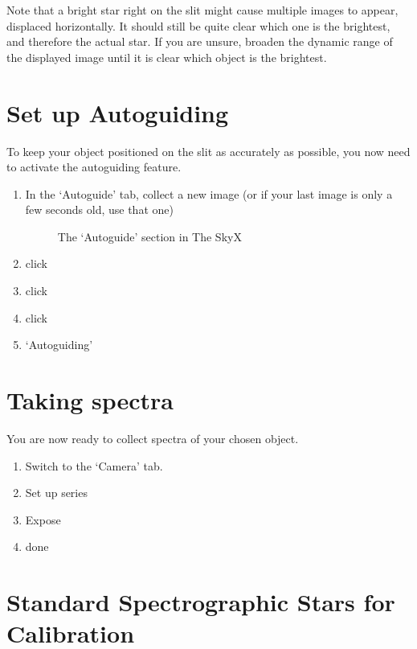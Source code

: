\documentclass[12pt,twoside,a4paper]{report}
\begin{document}
Note that a bright star right on the slit might cause multiple images to appear, displaced horizontally. It should still be quite clear which one is the brightest, and therefore the actual star. If you are unsure, broaden the dynamic range of the displayed image until it is clear which object is the brightest.


\section{Set up Autoguiding}

To keep your object positioned on the slit as accurately as possible, you now need to activate the autoguiding feature.

\begin{enumerate}
 \item In the `Autoguide' tab, collect a new image (or if your last image is only a few seconds old, use that one)

  \begin{figure}[ht]
  \centering
    \caption{\label{fig:autoguide}The `Autoguide' section in The SkyX}
 \end{figure}

 \item click
 \item click
 \item click
 \item `Autoguiding'

\end{enumerate}


\section{Taking spectra}

You are now ready to collect spectra of your chosen object.

\begin{enumerate}
 \item Switch to the `Camera' tab.
 \item Set up series
 \item Expose
 \item done
\end{enumerate}

\section{Standard Spectrographic Stars for Calibration}
\end{document}
